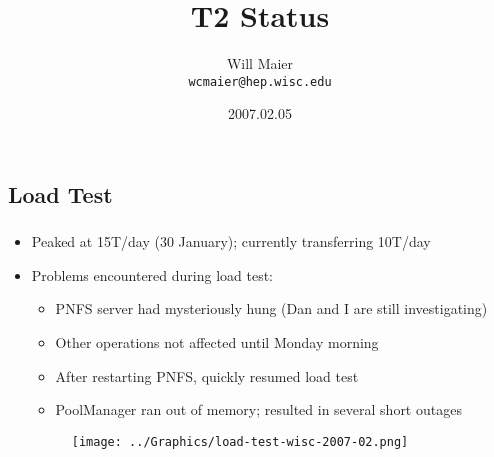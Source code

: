\documentclass{beamer}
\title{T2 Status}
\author[Will Maier]{Will Maier \\ \texttt{wcmaier@hep.wisc.edu}}
\institute[Wisconsin]{University of Wisconsin}
\date{2007.02.05}
\newcommand{\newframe}[1]{\section{#1}
    \frametitle{\sc{#1}}}
\begin{document}


\begin{frame}
\newframe{Load Test}
\begin{itemize}
    \item Peaked at 15T/day (30 January); currently transferring 10T/day
    \item Problems encountered during load test:
    \begin{itemize}
        \item PNFS server had mysteriously hung (Dan and I are still investigating)
        \item Other operations not affected until Monday morning
        \item After restarting PNFS, quickly resumed load test
        \item PoolManager ran out of memory; resulted in several short outages
    \end{itemize}

    \begin{center}
    \begin{figure}
        \texttt{[image: ../Graphics/load-test-wisc-2007-02.png]}
    \end{figure}
    \end{center}
\end{itemize}
\end{frame}
\end{document}
